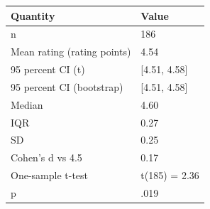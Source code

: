 \begin{table}[ht]
\centering
\begingroup\footnotesize
\begin{tabular}{ll}
  \toprule
Quantity & Value \\ 
  \midrule
n & 186 \\ 
  Mean rating (rating points) & 4.54 \\ 
  95 percent CI (t) & [4.51, 4.58] \\ 
  95 percent CI (bootstrap) & [4.51, 4.58] \\ 
  Median & 4.60 \\ 
  IQR & 0.27 \\ 
  SD & 0.25 \\ 
  Cohen's d vs 4.5 & 0.17 \\ 
  One-sample t-test & t(185) = 2.36 \\ 
  p & .019 \\ 
   \bottomrule
\end{tabular}
\endgroup
\end{table}
